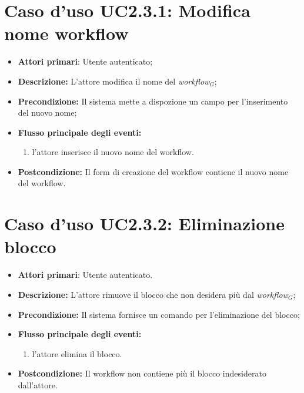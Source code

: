 		\section{Caso d'uso UC2.3.1: Modifica nome workflow}
		\begin{itemize}
			\item \textbf{Attori primari}: Utente autenticato;
			\item \textbf{Descrizione:} L'attore modifica il nome del \textit{workflow$_{G}$};
			\item \textbf{Precondizione:} Il sistema mette a dispozione un campo per l'inserimento del nuovo nome;
			\item \textbf{Flusso principale degli eventi:}
			\begin{enumerate}
				\item l'attore inserisce il nuovo nome del workflow.
			\end{enumerate}
			\item \textbf{Postcondizione:} Il form di creazione del workflow contiene il nuovo nome del workflow.
		\end{itemize}
		\section{Caso d'uso UC2.3.2: Eliminazione blocco }
		\begin{itemize}
			\item \textbf{Attori primari}: Utente autenticato.
			\item \textbf{Descrizione:} L'attore rimuove il blocco che non desidera più dal \textit{workflow$_{G}$};
			\item \textbf{Precondizione:} Il sistema fornisce un comando per l'eliminazione del blocco;
			\item \textbf{Flusso principale degli eventi:}
			\begin{enumerate}
				\item l'attore elimina il blocco.
			\end{enumerate}
			\item \textbf{Postcondizione:} Il workflow non contiene più il blocco indesiderato dall'attore.
		\end{itemize}
